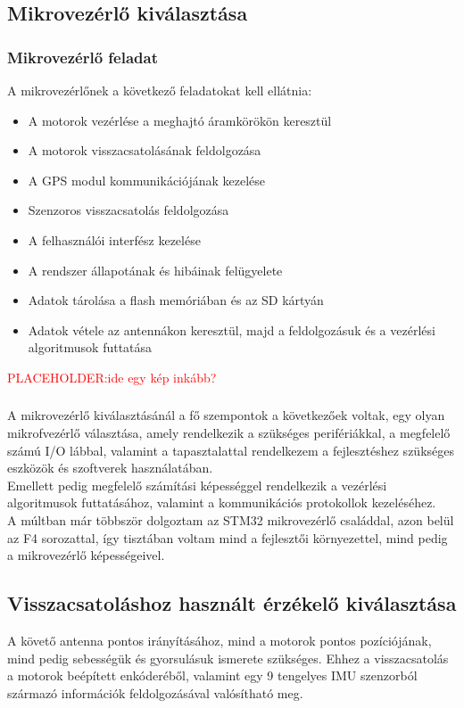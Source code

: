 \subsection{Mikrovezérlő kiválasztása}
\label{subsec:mikrovez-kivalasztas}


\subsubsection{Mikrovezérlő feladat}
A mikrovezérlőnek a következő feladatokat kell ellátnia:
\begin{itemize}
    \item A motorok vezérlése a meghajtó áramkörökön keresztül
    \item A motorok visszacsatolásának feldolgozása
    \item A GPS modul kommunikációjának kezelése
    \item Szenzoros visszacsatolás feldolgozása
    \item A felhasználói interfész kezelése
    \item A rendszer állapotának és hibáinak felügyelete
    \item Adatok tárolása a flash memóriában és az SD kártyán
    \item Adatok vétele az antennákon keresztül, majd a feldolgozásuk és a vezérlési algoritmusok futtatása
\end{itemize}
\textcolor{red}{PLACEHOLDER:ide egy kép inkább?}

\subsubsection{}
A mikrovezérlő kiválasztásánál a fő szempontok a következőek voltak, egy olyan 
mikrofvezérlő választása, amely rendelkezik a szükséges perifériákkal, a megfelelő
számú I/O lábbal, valamint a tapasztalattal rendelkezem a fejlesztéshez szükséges eszközök és szoftverek használatában. \\
Emellett pedig megfelelő számítási képességgel rendelkezik a vezérlési algoritmusok futtatásához, valamint a kommunikációs protokollok kezeléséhez. \\
A múltban már többször dolgoztam az STM32 mikrovezérlő családdal, azon belül az F4 sorozattal, 
így tisztában voltam mind a fejlesztői környezettel, mind pedig a mikrovezérlő képességeivel. \\


\subsection{Visszacsatoláshoz használt érzékelő kiválasztása}
\label{subsec:visszacsat-erzekelo-kivalasztas}
A követő antenna pontos irányításához, mind a motorok pontos pozíciójának, mind pedig sebességük
és gyorsulásuk ismerete szükséges. Ehhez a visszacsatolás a motorok beépített enkóderéből, valamint egy 
9 tengelyes IMU szenzorból származó információk feldolgozásával valósítható meg. \\

